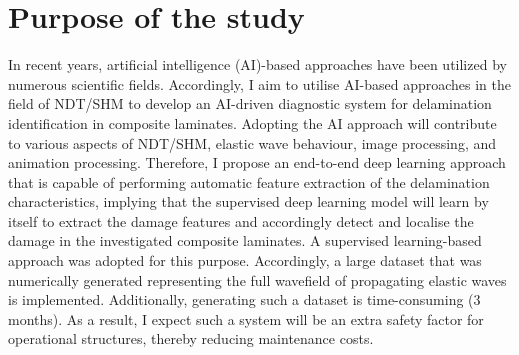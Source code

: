 \section{Purpose of the study}
\label{sec12}
In recent years, artificial intelligence (AI)-based approaches have been utilized by numerous scientific fields.
Accordingly, I aim to utilise AI-based approaches in the field of NDT/SHM to develop an AI-driven diagnostic system for delamination identification in composite laminates.
Adopting the AI approach will contribute to various aspects of NDT/SHM, elastic wave behaviour, image processing, and animation processing.
Therefore, I propose an end-to-end deep learning approach that is capable of performing automatic feature extraction of the delamination characteristics, implying that the supervised deep learning model will learn by itself to extract the damage features and accordingly detect and localise the damage in the investigated composite laminates.
A supervised learning-based approach was adopted for this purpose.
Accordingly, a large dataset that was numerically generated representing the full wavefield of propagating elastic waves is implemented.
Additionally, generating such a dataset is time-consuming (3 months).
As a result, I expect such a system will be an extra safety factor for operational structures, thereby reducing maintenance costs.
